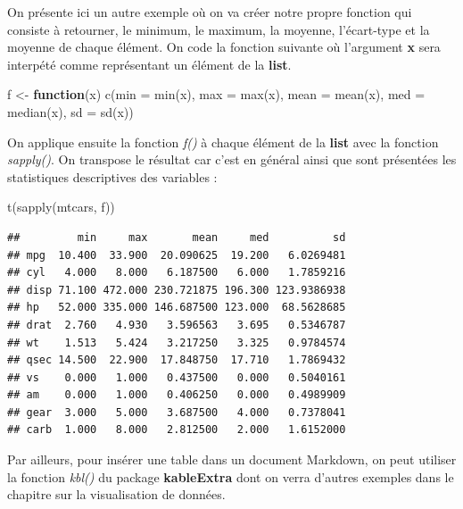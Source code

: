 \documentclass[
]{book}
\newenvironment{Shaded}{\begin{snugshade}}{\end{snugshade}}
\newcommand{\AttributeTok}[1]{\textcolor[rgb]{0.77,0.63,0.00}{#1}}
\newcommand{\ControlFlowTok}[1]{\textcolor[rgb]{0.13,0.29,0.53}{\textbf{#1}}}
\newcommand{\FunctionTok}[1]{\textcolor[rgb]{0.00,0.00,0.00}{#1}}
\newcommand{\NormalTok}[1]{#1}
\newcommand{\OtherTok}[1]{\textcolor[rgb]{0.56,0.35,0.01}{#1}}
\theoremstyle{definition}
\theoremstyle{definition}
\theoremstyle{definition}
\theoremstyle{definition}
\theoremstyle{remark}
\begin{document}
On présente ici un autre exemple où on va créer notre propre fonction qui consiste à retourner, le minimum, le maximum, la moyenne, l'écart-type et la moyenne de chaque élément. On code la fonction suivante où l'argument \textbf{x} sera interpété comme représentant un élément de la \textbf{list}.

\begin{Shaded}
\begin{Highlighting}[]
\NormalTok{f }\OtherTok{\textless{}{-}} \ControlFlowTok{function}\NormalTok{(x) }
  \FunctionTok{c}\NormalTok{(}\AttributeTok{min =} \FunctionTok{min}\NormalTok{(x), }\AttributeTok{max =} \FunctionTok{max}\NormalTok{(x), }\AttributeTok{mean =} \FunctionTok{mean}\NormalTok{(x), }\AttributeTok{med =} \FunctionTok{median}\NormalTok{(x), }\AttributeTok{sd =} \FunctionTok{sd}\NormalTok{(x))}
\end{Highlighting}
\end{Shaded}

On applique ensuite la fonction \emph{f()} à chaque élément de la \textbf{list} avec la fonction \emph{sapply()}. On transpose le résultat car c'est en général ainsi que sont présentées les statistiques descriptives des variables :

\begin{Shaded}
\begin{Highlighting}[]
\FunctionTok{t}\NormalTok{(}\FunctionTok{sapply}\NormalTok{(mtcars, f))}
\end{Highlighting}
\end{Shaded}

\begin{verbatim}
##         min     max       mean     med          sd
## mpg  10.400  33.900  20.090625  19.200   6.0269481
## cyl   4.000   8.000   6.187500   6.000   1.7859216
## disp 71.100 472.000 230.721875 196.300 123.9386938
## hp   52.000 335.000 146.687500 123.000  68.5628685
## drat  2.760   4.930   3.596563   3.695   0.5346787
## wt    1.513   5.424   3.217250   3.325   0.9784574
## qsec 14.500  22.900  17.848750  17.710   1.7869432
## vs    0.000   1.000   0.437500   0.000   0.5040161
## am    0.000   1.000   0.406250   0.000   0.4989909
## gear  3.000   5.000   3.687500   4.000   0.7378041
## carb  1.000   8.000   2.812500   2.000   1.6152000
\end{verbatim}

Par ailleurs, pour insérer une table dans un document Markdown, on peut utiliser la fonction \emph{kbl()} du package \textbf{kableExtra} dont on verra d'autres exemples dans le chapitre sur la visualisation de données.
\end{document}
